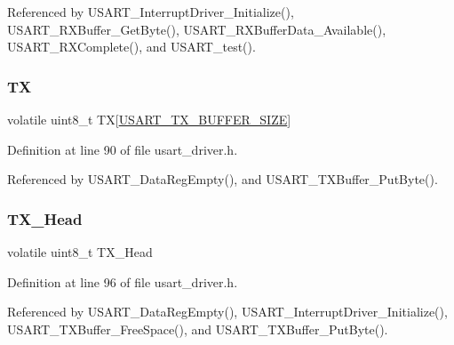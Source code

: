 Referenced by U\+S\+A\+R\+T\+\_\+\+Interrupt\+Driver\+\_\+\+Initialize(), U\+S\+A\+R\+T\+\_\+\+R\+X\+Buffer\+\_\+\+Get\+Byte(), U\+S\+A\+R\+T\+\_\+\+R\+X\+Buffer\+Data\+\_\+\+Available(), U\+S\+A\+R\+T\+\_\+\+R\+X\+Complete(), and U\+S\+A\+R\+T\+\_\+test().

\hypertarget{struct_u_s_a_r_t___buffer_a392312bfc5a33886fa4c6999cea21ecc}{}\label{struct_u_s_a_r_t___buffer_a392312bfc5a33886fa4c6999cea21ecc} 
\subsubsection{\texorpdfstring{TX}{TX}}
{\footnotesize\ttfamily volatile uint8\+\_\+t TX\mbox{[}\hyperlink{usart__driver_8h_a21d527450b438bba8dab02e03f021ee3}{U\+S\+A\+R\+T\+\_\+\+T\+X\+\_\+\+B\+U\+F\+F\+E\+R\+\_\+\+S\+I\+ZE}\mbox{]}}



Definition at line 90 of file usart\+\_\+driver.\+h.



Referenced by U\+S\+A\+R\+T\+\_\+\+Data\+Reg\+Empty(), and U\+S\+A\+R\+T\+\_\+\+T\+X\+Buffer\+\_\+\+Put\+Byte().

\hypertarget{struct_u_s_a_r_t___buffer_ae18341a2700d746f90841b29ce8b05ca}{}\label{struct_u_s_a_r_t___buffer_ae18341a2700d746f90841b29ce8b05ca} 
\subsubsection{\texorpdfstring{T\+X\+\_\+\+Head}{TX\_Head}}
{\footnotesize\ttfamily volatile uint8\+\_\+t T\+X\+\_\+\+Head}



Definition at line 96 of file usart\+\_\+driver.\+h.



Referenced by U\+S\+A\+R\+T\+\_\+\+Data\+Reg\+Empty(), U\+S\+A\+R\+T\+\_\+\+Interrupt\+Driver\+\_\+\+Initialize(), U\+S\+A\+R\+T\+\_\+\+T\+X\+Buffer\+\_\+\+Free\+Space(), and U\+S\+A\+R\+T\+\_\+\+T\+X\+Buffer\+\_\+\+Put\+Byte().

\hypertarget{struct_u_s_a_r_t___buffer_ab4c125e286a5f36c1f44256fd35eb66d}{}\label{struct_u_s_a_r_t___buffer_ab4c125e286a5f36c1f44256fd35eb66d} 
